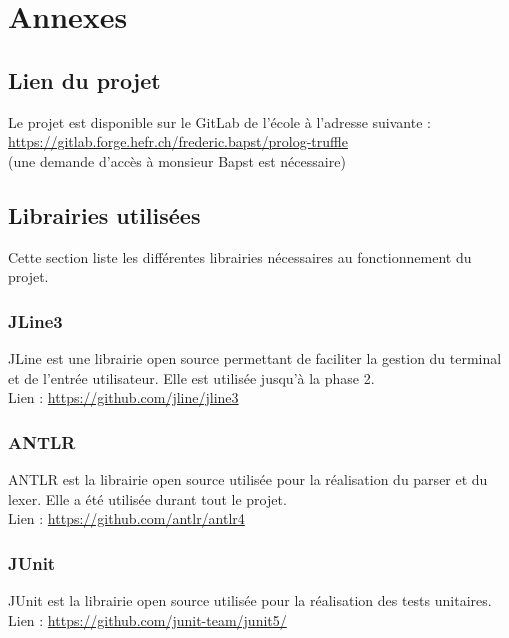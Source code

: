 \documentclass[../report.tex]{subfiles}
\begin{document}
\section{Annexes}
\subsection{Lien du projet}\label{subsec:projectlink}
Le projet est disponible sur le GitLab de l'école à l'adresse suivante :\\
\href{https://gitlab.forge.hefr.ch/frederic.bapst/prolog-truffle}{https://gitlab.forge.hefr.ch/frederic.bapst/prolog-truffle}\\
(une demande d'accès à monsieur Bapst est nécessaire)
\subsection{Librairies utilisées}
Cette section liste les différentes librairies nécessaires au fonctionnement du projet.
\subsubsection*{JLine3}
JLine est une librairie open source permettant de faciliter la gestion du terminal et de l'entrée utilisateur. Elle est utilisée jusqu'à la phase 2.\\
Lien : \href{https://github.com/jline/jline3}{https://github.com/jline/jline3}
\subsubsection*{ANTLR}
ANTLR est la librairie open source utilisée pour la réalisation du parser et du lexer. Elle a été utilisée durant tout le projet.\\
Lien : \href{https://github.com/antlr/antlr4}{https://github.com/antlr/antlr4}
\subsubsection*{JUnit}
JUnit est la librairie open source utilisée pour la réalisation des tests unitaires.\\
Lien : \href{https://github.com/junit-team/junit5/}{https://github.com/junit-team/junit5/}
\end{document}
